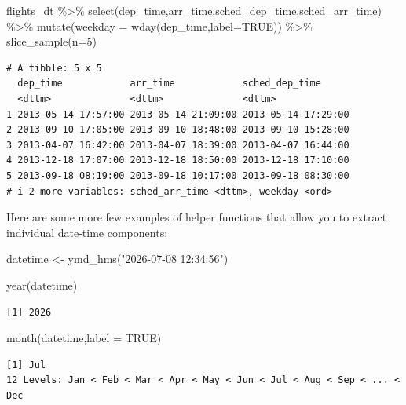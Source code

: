 \documentclass[
  letterpaper,
  DIV=11,
  numbers=noendperiod]{scrartcl}
\newenvironment{Shaded}{\begin{snugshade}}{\end{snugshade}}
\newcommand{\AttributeTok}[1]{\textcolor[rgb]{0.40,0.45,0.13}{#1}}
\newcommand{\ConstantTok}[1]{\textcolor[rgb]{0.56,0.35,0.01}{#1}}
\newcommand{\DecValTok}[1]{\textcolor[rgb]{0.68,0.00,0.00}{#1}}
\newcommand{\FunctionTok}[1]{\textcolor[rgb]{0.28,0.35,0.67}{#1}}
\newcommand{\NormalTok}[1]{\textcolor[rgb]{0.00,0.23,0.31}{#1}}
\newcommand{\OtherTok}[1]{\textcolor[rgb]{0.00,0.23,0.31}{#1}}
\newcommand{\SpecialCharTok}[1]{\textcolor[rgb]{0.37,0.37,0.37}{#1}}
\newcommand{\StringTok}[1]{\textcolor[rgb]{0.13,0.47,0.30}{#1}}
\begin{document}
\begin{Shaded}
\begin{Highlighting}[]
\NormalTok{flights\_dt }\SpecialCharTok{\%\textgreater{}\%}
   \FunctionTok{select}\NormalTok{(dep\_time,arr\_time,sched\_dep\_time,sched\_arr\_time) }\SpecialCharTok{\%\textgreater{}\%}
  \FunctionTok{mutate}\NormalTok{(}\AttributeTok{weekday =} \FunctionTok{wday}\NormalTok{(dep\_time,}\AttributeTok{label=}\ConstantTok{TRUE}\NormalTok{)) }\SpecialCharTok{\%\textgreater{}\%}
  \FunctionTok{slice\_sample}\NormalTok{(}\AttributeTok{n=}\DecValTok{5}\NormalTok{)}
\end{Highlighting}
\end{Shaded}

\begin{verbatim}
# A tibble: 5 x 5
  dep_time            arr_time            sched_dep_time     
  <dttm>              <dttm>              <dttm>             
1 2013-05-14 17:57:00 2013-05-14 21:09:00 2013-05-14 17:29:00
2 2013-09-10 17:05:00 2013-09-10 18:48:00 2013-09-10 15:28:00
3 2013-04-07 16:42:00 2013-04-07 18:39:00 2013-04-07 16:44:00
4 2013-12-18 17:07:00 2013-12-18 18:50:00 2013-12-18 17:10:00
5 2013-09-18 08:19:00 2013-09-18 10:17:00 2013-09-18 08:30:00
# i 2 more variables: sched_arr_time <dttm>, weekday <ord>
\end{verbatim}

Here are some more few examples of helper functions that allow you to
extract individual date-time components:

\begin{Shaded}
\begin{Highlighting}[]
\NormalTok{datetime }\OtherTok{\textless{}{-}} \FunctionTok{ymd\_hms}\NormalTok{(}\StringTok{"2026{-}07{-}08 12:34:56"}\NormalTok{)}

\FunctionTok{year}\NormalTok{(datetime)}
\end{Highlighting}
\end{Shaded}

\begin{verbatim}
[1] 2026
\end{verbatim}

\begin{Shaded}
\begin{Highlighting}[]
\FunctionTok{month}\NormalTok{(datetime,}\AttributeTok{label =} \ConstantTok{TRUE}\NormalTok{)}
\end{Highlighting}
\end{Shaded}

\begin{verbatim}
[1] Jul
12 Levels: Jan < Feb < Mar < Apr < May < Jun < Jul < Aug < Sep < ... < Dec
\end{verbatim}
\end{document}
